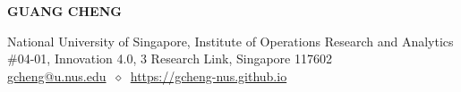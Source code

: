 \documentclass[12pt, a4paper]{article}
\begin{document}



\thispagestyle{firstpage}

{\par \centering\MakeUppercase{\Large\bf Guang Cheng} \par}
\vspace*{-2mm}
\centering
\footnotesize{National University of Singapore, Institute of Operations Research and Analytics} \\
\footnotesize{\#04-01, Innovation 4.0, 3 Research Link, Singapore 117602} \\
\footnotesize{\href{mailto:gcheng@u.nus.edu}{gcheng@u.nus.edu}} $\ \diamond \ $ \footnotesize{\href{https://gcheng-nus.github.io}{https://gcheng-nus.github.io}}

\vspace*{1em}
\end{document}
